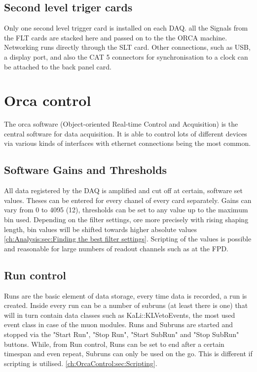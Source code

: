  \subsection{Second level triger cards}
  \label{ch:DAQ:sec:SLTs}
  Only one second level trigger card is installed on each DAQ. all the Signals from the FLT cards are stacked here and passed on to the the ORCA machine. Networking runs directly through the SLT card. Other connections, such as USB, a display port, and also the CAT 5 connectors for synchronisation to a clock can be attached to the back panel card.


  \section{Orca control}
  \label{ch:OrcaControl}
  The orca software (Object-oriented Real-time Control and Acquisition) \cite{How09} is the central software for data acquisition. It is able to control lots of different devices via various kinds of interfaces with ethernet connections being the most common.

    \subsection{Software Gains and Thresholds}
    \label{ch:OrcaControl:sec:SoftwareGainsThresholds}
    All data registered by the DAQ is amplified and cut off at certain, software set values. Theses can be entered for every chanel of every card separately. Gains can vary from \SI{0}{} to \SI{4095}{} (\SI{12}{\bit}), thresholds can be set to any value up to the maximum bin used. Depending on the filter settings, ore more precisely with rising shaping length, bin values will be shifted  towards higher absolute values \ref{ch:Analysis:sec:Finding the best filter settings}.
    Scripting of the values is possible and reasonable for large numbers of readout channels such as at the FPD.
    
    \subsection{Run control}
    \label{ch:OrcaControl:sec:RunControl}
    Runs are the basic element of data storage, every time data is recorded, a run is created. Inside every run can be a number of subruns (at least there is one) that will in turn contain data classes such as KaLi::KLVetoEvents, the most used event class in case of the muon modules. Runs and Subruns are started and stopped via the "Start Run", "Stop Run", "Start SubRun" and "Stop SubRun" buttons. While, from Run control, Runs can be set to end after a certain timespan and even repeat, Subruns can only be used on the go. This is different if scripting is utilised. \ref{ch:OrcaControl:sec:Scripting}.
    
